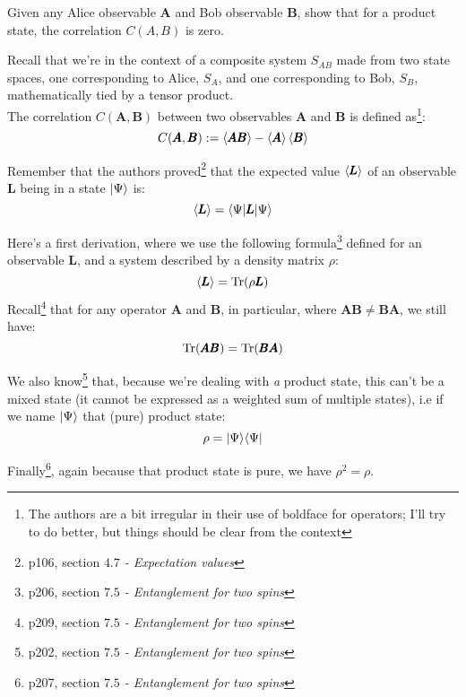 \documentclass[solutions.tex]{subfiles}
\begin{document}
\maketitle
\begin{exercise} Given any Alice observable $\bm{A}$ and Bob observable
$\bm{B}$, show that for a product state, the correlation $C(A, B)$ is zero.
\end{exercise}

Recall that we're in the context of a composite system $S_{AB}$ made from two
state spaces, one corresponding to Alice, $S_A$, and one corresponding to Bob,
$S_B$, mathematically tied by a tensor product. \\

The correlation $C(\bm{A}, \bm{B})$ between two observables $\bm{A}$ and $\bm{B}$
is defined as\footnote{The authors are a bit irregular in their use of boldface
for operators; I'll try to do better, but things should be clear from the context}:
\[
	C(\pmb{A}, \pmb{B}) := \left\langle \pmb{AB} \right\rangle - \left\langle \pmb{A} \right\rangle\left\langle \pmb{B} \right\rangle
\]

Remember that the authors proved\footnote{p106, section \textit{
$4.7$ - Expectation values}} that the expected value
$\left\langle \pmb{L} \right\rangle$ of an observable $\bm{L}$ being
in a state $|\Psi\rangle$ is:
\[
	\left\langle \pmb{L} \right\rangle = \langle \Psi|\pmb{L}|\Psi\rangle
\]

\hr
Here's a first derivation, where we use the following formula\footnote{p206,
section \textit{$7.5$ - Entanglement for two spins}} defined for an
observable $\bm{L}$, and a system described by a density matrix $\rho$:
\[
	\left\langle \pmb{L} \right\rangle = \text{Tr}(\rho\pmb{L})
\]
Recall\footnote{p209, section \textit{$7.5$ - Entanglement for two spins}}
 that for any operator $\bm{A}$ and $\bm{B}$, in particular,
where $\bm{AB} \neq \bm{BA}$, we still have:
\[
	\text{Tr}(\pmb{AB}) = \text{Tr}(\pmb{BA})
\]

We also know\footnote{p202, section \textit{$7.5$ - Entanglement for two spins}}
that, because we're dealing with \textit{a} product state, this can't be
a mixed state (it cannot be expressed as a weighted sum of multiple
states), i.e if we name $|\Psi\rangle$ that (pure) product state:
\[
	\rho = |\Psi\rangle\langle \Psi|
\]

Finally\footnote{p207, section \textit{$7.5$ - Entanglement for two spins}},
again because that product state is pure, we have $\rho^2 = \rho$. \\
\end{document}
